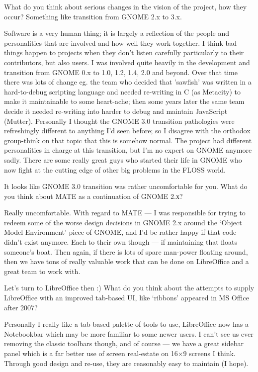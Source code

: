 \documentclass[10pt, a5paper]{article}
\begin{document}
\begin{Parallel}[p]{}{}
{\q What do you think about serious changes in the vision of the project, how they occur? Something like transition from GNOME 2.x to 3.x.

\a Software is a very human thing; it is largely a reflection of the people and personalities that are involved and how well they work together. I think bad things happen to projects when they don't listen carefully particularly to their contributors, but also users. I was involved quite heavily in the development and transition from GNOME 0.x to 1.0, 1.2, 1.4, 2.0 and beyond. Over that time there was lots of change eg. the team who decided that 'sawfish' was written in a hard-to-debug scripting language and needed re-writing in C (as Metacity) to make it maintainable to some heart-ache; then some years later the same team decide it needed re-writing into harder to debug and maintain JavaScript (Mutter). Personally I thought the GNOME 3.0 transition pathologies were refreshingly different to anything I'd seen before; so I disagree with the orthodox group-think on that topic that this is somehow normal. The project had different personalities in charge at this transition, but I'm no expert on GNOME anymore sadly. There are some really great guys who started their life in GNOME who now fight at the cutting edge of other big problems in the FLOSS world.

\q It looks like GNOME 3.0 transition was rather uncomfortable for you. What do you think about MATE as a continuation of GNOME 2.х?

\a Really uncomfortable. With regard to MATE — I was responsible for trying to redeem some of the worse design decisions in GNOME 2.x around the ‘Object Model Environment’ piece of GNOME, and I'd be rather happy if that code didn't exist anymore. Each to their own though — if maintaining that floats someone's boat. Then again, if there is lots of spare man-power floating around, then we have tons of really valuable work that can be done on LibreOffice and a great team to work with.

\q Let's turn to LibreOffice then :) What do you think about the attempts to supply LibreOffice with an improved tab-based UI, like ‘ribbons’ appeared in MS Office after 2007?

\a Personally I really like a tab-based palette of tools to use, \linebreak LibreOffice now has a Notebookbar which may be more familiar to some newer users. I can't see us ever removing the classic toolbars though, and of course — we have a great sidebar panel which is a far better use of screen real-estate on 16×9 screens I think. Through good design and re-use, they are reasonably easy to maintain (I hope).

}
\end{Parallel}
\end{document}
